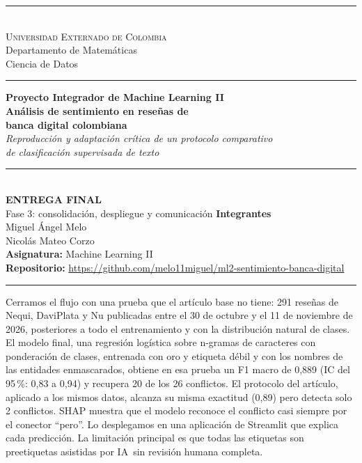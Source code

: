 \documentclass[11pt,a4paper]{article}
\newif\ifkappa
\begin{document}
\begin{titlepage}
\centering
\vspace*{1.5cm}
{\color{verde}\rule{\linewidth}{1.5pt}}\\[0.5em]
{\scshape\color{verde}Universidad Externado de Colombia}\\[0.2em]
{\small\color{gray}Departamento de Matemáticas\\Ciencia de Datos}\\[0.3em]
{\color{verde}\rule{\linewidth}{0.5pt}}
\vspace{3cm}

{\large\bfseries\color{verde}Proyecto Integrador de Machine Learning II}\\[1.2em]
{\LARGE\bfseries Análisis de sentimiento en reseñas de\\[0.2em] banca digital colombiana}\\[1em]
{\itshape Reproducción y adaptación crítica de un protocolo comparativo\\ de clasificación supervisada de texto}\\[1.5em]
{\color{dorado}\rule{0.45\linewidth}{1pt}}\\[1.5em]
{\bfseries ENTREGA FINAL}\\[0.3em]
Fase 3: consolidación, despliegue y comunicación
\vfill
{\bfseries\color{verde}Integrantes}\\[0.5em]
Miguel Ángel Melo\\[0.3em]
Nicolás Mateo Corzo\\[1.5em]
\textbf{Asignatura:} Machine Learning II\\[0.4em]
\textbf{Repositorio:} \url{https://github.com/melo11miguel/ml2-sentimiento-banca-digital}\\[1cm]
{\color{verde}\rule{\linewidth}{1.5pt}}
\end{titlepage}

\begin{tcolorbox}[colback=verde!6,colframe=verde,title=\textbf{Resumen de la entrega},fonttitle=\small,fontupper=\small]
Cerramos el flujo con una prueba que el artículo base no tiene: 291 reseñas de Nequi, DaviPlata y Nu
publicadas entre el 30 de octubre y el 11 de noviembre de 2026, posteriores a todo el entrenamiento
y con la distribución natural de clases. El modelo final, una regresión logística sobre n-gramas de
caracteres con ponderación de clases, entrenada con oro y etiqueta débil y con los nombres de las
entidades enmascarados, obtiene en esa prueba un F1 macro de 0,889 (IC del 95\,\%: 0,83 a 0,94) y
recupera 20 de los 26 conflictos. El protocolo del artículo, aplicado a los mismos datos, alcanza su
misma exactitud (0,89) pero detecta solo 2 conflictos. SHAP muestra que el modelo reconoce el
conflicto casi siempre por el conector ``pero''. Lo desplegamos en una aplicación de Streamlit que
explica cada predicción. La limitación principal es que todas las etiquetas son preetiquetas
asistidas por IA\ifkappa\ revisadas por el equipo\else\ sin revisión humana completa\fi.
\end{tcolorbox}
\end{document}
